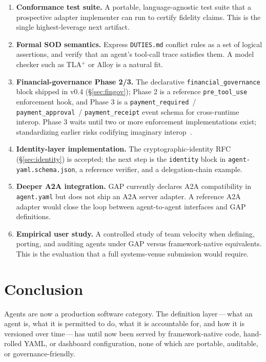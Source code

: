 \documentclass[11pt,a4paper]{article}
\begin{document}
\begin{enumerate}
  \item \textbf{Conformance test suite.} A portable, language-agnostic test suite that
  a prospective adapter implementer can run to certify fidelity claims. This is the
  single highest-leverage next artifact.
  \item \textbf{Formal SOD semantics.} Express \texttt{DUTIES.md} conflict rules as a
  set of logical assertions, and verify that an agent's tool-call trace satisfies
  them. A model checker such as TLA$^+$ or Alloy is a natural fit.
  \item \textbf{Financial-governance Phase 2/3.} The declarative
  \texttt{financial\_governance} block shipped in v0.4 (\S\ref{sec:fingov}); Phase 2 is
  a reference \texttt{pre\_tool\_use} enforcement hook, and Phase 3 is a
  \texttt{payment\_required}~/ \texttt{payment\_approval}~/ \texttt{payment\_receipt}
  event schema for cross-runtime interop. Phase 3 waits until two or more enforcement
  implementations exist; standardizing earlier risks codifying imaginary
  interop~\cite{rfc_38}.
  \item \textbf{Identity-layer implementation.} The cryptographic-identity RFC
  (\S\ref{sec:identity}) is accepted; the next step is the \texttt{identity} block in
  \texttt{agent-yaml.schema.json}, a reference verifier, and a delegation-chain example.
  \item \textbf{Deeper A2A integration.} GAP currently declares A2A compatibility in
  \texttt{agent.yaml} but does not ship an A2A server adapter. A reference A2A
  adapter would close the loop between agent-to-agent interfaces and GAP definitions.
  \item \textbf{Empirical user study.} A controlled study of team velocity when
  defining, porting, and auditing agents under GAP versus framework-native
  equivalents. This is the evaluation that a full systems-venue submission would
  require.
\end{enumerate}

\section{Conclusion}\label{sec:conclusion}

Agents are now a production software category. The definition layer\,---\,what an
agent is, what it is permitted to do, what it is accountable for, and how it is
versioned over time\,---\,has until now been served by framework-native code,
hand-rolled YAML, or dashboard configuration, none of which are portable, auditable,
or governance-friendly.
\end{document}
